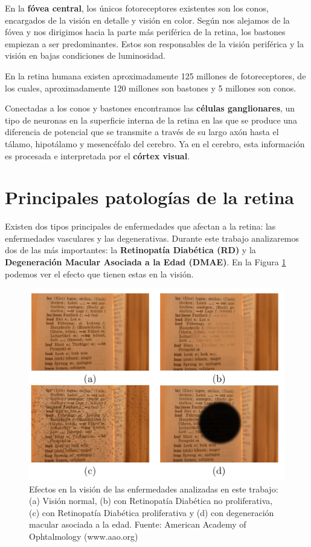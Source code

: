 \documentclass[
  12pt,
  spanish,
  a4paperpaper,
]{report}
\begin{document}
En la \textbf{fóvea central}, los únicos fotoreceptores existentes son
los conos, encargados de la visión en detalle y visión en color. Según
nos alejamos de la fóvea y nos dirigimos hacia la parte más periférica
de la retina, los bastones empiezan a ser predominantes. Estos son
responsables de la visión periférica y la visión en bajas condiciones de
luminosidad.

En la retina humana existen aproximadamente 125 millones de
fotoreceptores, de los cuales, aproximadamente 120 millones son bastones
y 5 millones son conos.

Conectadas a los conos y bastones encontramos las \textbf{células
ganglionares}, un tipo de neuronas en la superficie interna de la retina
en las que se produce una diferencia de potencial que se transmite a
través de su largo axón hasta el tálamo, hipotálamo y mesencéfalo del
cerebro. Ya en el cerebro, esta información es procesada e interpretada
por el \textbf{córtex visual}.

\hypertarget{principales-patologuxedas-de-la-retina}{%
\section{Principales patologías de la
retina}\label{principales-patologuxedas-de-la-retina}}

Existen dos tipos principales de enfermedades que afectan a la retina:
las enfermedades vasculares y las degenerativas. Durante este trabajo
analizaremos dos de las más importantes: la \textbf{Retinopatía
Diabética (RD)} y la \textbf{Degeneración Macular Asociada a la Edad
(DMAE)}. En la Figura \ref{enfermedades} podemos ver el efecto que
tienen estas en la visión.

\begin{figure}
\centering
\includegraphics[width=1\textwidth,height=\textheight]{source/figures/vision.png}
\caption{Efectos en la visión de las enfermedades analizadas en este
trabajo: (a) Visión normal, (b) con Retinopatía Diabética no
proliferativa, (c) con Retinopatía Diabética proliferativa y (d) con
degeneración macular asociada a la edad. Fuente: American Academy of
Ophtalmology (www.aao.org) \label{enfermedades}}
\end{figure}
\end{document}

